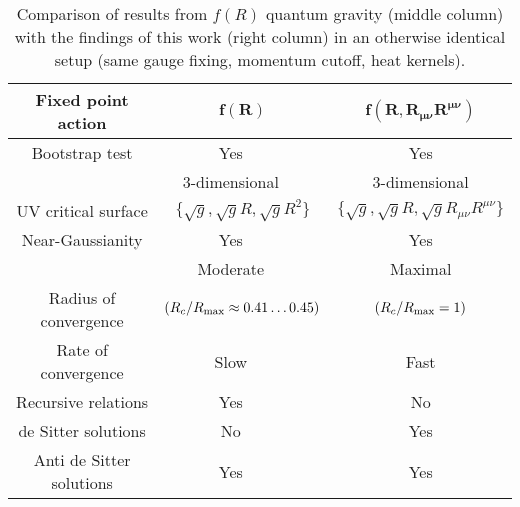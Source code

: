 \documentclass[notitlepage,eqsecnum,bm,amsmath,preprintnumbers,superscriptaddress,nofootinbib,aps,11pt]{revtex4-1}
\begin{document}
 \begin{center}
\begin{table}
\normalsize\begin{tabular}{ccc} 
\toprule
\rowcolor{Yellow}
\bf Fixed point action&$\bm{f(R)}$&\multicolumn{1}{c}{$\bm{f(R, R_{\mu\nu}R^{\mu\nu})}$} 
\\ 
\midrule
\rowcolor{LightGray}
Bootstrap test&Yes\ \ \ \cite{Falls:2013bv,Falls:2014tra}&Yes\\
&3-dimensional\ \ \ \cite{Codello:2007bd,Falls:2013bv,Falls:2014tra}&3-dimensional\\
\multirow{-2}{*}{UV critical surface}
&$\ \ \{\sqrt{g},\sqrt{g}R,\sqrt{g}R^2\}\ \ $
&$\{\sqrt{g},\sqrt{g}R,\sqrt{g}R_{\mu\nu}R^{\mu\nu}\}$\\
\rowcolor{LightGray}
Near-Gaussianity&Yes\ \ \ \cite{Falls:2013bv,Falls:2014tra}&Yes\\
&Moderate\ \ \ \cite{Falls:2016wsa}&Maximal\\
\multirow{-2}{*}{Radius of convergence}&$(R_c/R_{\rm max}\approx 0.41\ldots0.45)$&$(R_c/R_{\rm max}=1)$\\
\rowcolor{LightGray}
Rate of convergence&Slow\ \ \ \cite{Falls:2016wsa}&Fast\\
Recursive relations&Yes\ \ \ \cite{Falls:2014tra}&No\\
\rowcolor{LightGray}
de Sitter solutions&No\ \ \ \cite{Falls:2016wsa}&Yes\\
Anti de Sitter solutions&Yes\ \ \ \cite{Falls:2016wsa}&Yes\\
\bottomrule
\end{tabular}  
\caption{\label{tCompare} Comparison of results from $f(R)$ quantum gravity (middle column) with the findings of this work (right column) in an otherwise identical setup (same gauge fixing, momentum cutoff, heat kernels).}
\end{table} 
\end{center}
\end{document}
